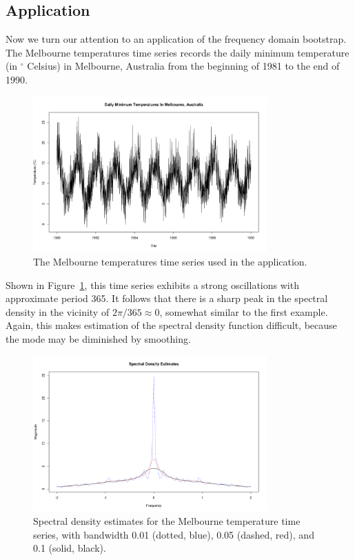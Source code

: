 \subsection*{Application}
Now we turn our attention to an application of the frequency domain bootstrap.
The Melbourne temperatures time series \cite{melbourne} records the daily 
minimum temperature (in $\phantom{}^\circ$ Celsius) in Melbourne,
Australia from the beginning of 1981 to the end of 1990.
    \begin{figure}[ht]
    \centering
    \includegraphics[width = 0.8\textwidth]{../res/exA.png}
    \caption{
        The Melbourne temperatures time series used in the application.
        }
    \label{exA}
    \end{figure}
Shown in Figure~\ref{exA}, this time series exhibits a strong oscillations with
approximate period 365.
It follows that there is a sharp peak in the spectral density in the
vicinity of $2\pi / 365 \approx 0$, somewhat similar to the first example.
Again, this makes estimation of the spectral density function difficult,
because the mode may be diminished by smoothing.
    \begin{figure}[ht]
    \centering
    \includegraphics[width = 0.8\textwidth]{../res/exA_spec.png}
    \caption{
        Spectral density estimates for the Melbourne temperature time series,
        with bandwidth 0.01 (dotted, blue), 0.05 (dashed, red), and 0.1
        (solid, black).
        }
    \label{exA_spec}
    \end{figure}

